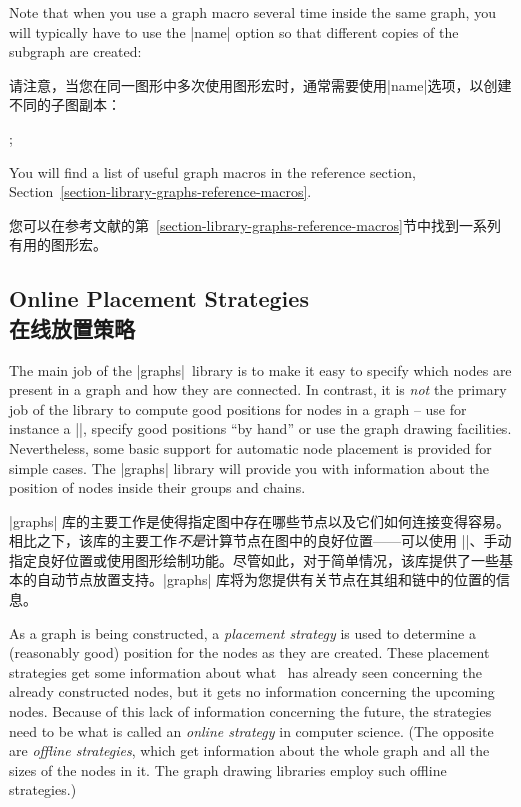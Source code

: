 Note that when you use a graph macro several time inside the same graph, you
will typically have to use the |name| option so that different copies of the
subgraph are created:

请注意，当您在同一图形中多次使用图形宏时，通常需要使用|name|选项，以创建不同的子图副本：

\begin{codeexample}[preamble={\usetikzlibrary{graphs}}]
\tikz {};
\end{codeexample}

You will find a list of useful graph macros in the reference section,
Section~\ref{section-library-graphs-reference-macros}.

您可以在参考文献的第~\ref{section-library-graphs-reference-macros}节中找到一系列有用的图形宏。


\subsection{Online Placement Strategies\\在线放置策略}
\label{section-library-graphs-placement}

The main job of the |graphs| library is to make it easy to specify which nodes
are present in a graph and how they are connected. In contrast, it is
\emph{not} the primary job of the library to compute good positions for nodes
in a graph -- use for instance a |\matrix|, specify good positions ``by hand''
or use the graph drawing facilities. Nevertheless, some basic support for
automatic node placement is provided for simple cases. The |graphs| library
will provide you with information about the position of nodes inside their
groups and chains.

|graphs| 库的主要工作是使得指定图中存在哪些节点以及它们如何连接变得容易。相比之下，该库的主要工作\emph{不是}计算节点在图中的良好位置——可以使用 |\matrix|、手动指定良好位置或使用图形绘制功能。尽管如此，对于简单情况，该库提供了一些基本的自动节点放置支持。|graphs| 库将为您提供有关节点在其组和链中的位置的信息。

As a graph is being constructed, a \emph{placement strategy} is used to
determine a (reasonably good) position for the nodes as they are created. These
placement strategies get some information about what \tikzname\ has already
seen concerning the already constructed nodes, but it gets no information
concerning the upcoming nodes. Because of this lack of information concerning
the future, the strategies need to be what is called an \emph{online strategy}
in computer science. (The opposite are \emph{offline strategies}, which get
information about the whole graph and all the sizes of the nodes in it. The
graph drawing libraries employ such offline strategies.)

